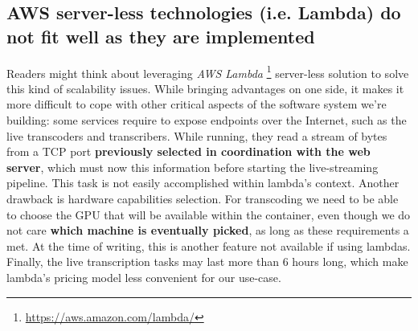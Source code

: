 \documentclass{article}
\begin{document}
\subsection{AWS server-less technologies (i.e. Lambda) do not fit well as they are implemented}
Readers might think about leveraging \textit{AWS Lambda} \footnote{\url{https://aws.amazon.com/lambda/}} server-less solution to solve this kind of scalability issues. While bringing advantages on one side, it makes it more difficult to cope with other critical aspects of the software system we're building: some services require to expose endpoints over the Internet, such as the live transcoders and transcribers. While running, they read a stream of bytes from a TCP port \textbf{previously selected in coordination with the web server}, which must now this information before starting the live-streaming pipeline. This task is not easily accomplished within lambda's context. Another drawback is hardware capabilities selection. For transcoding we need to be able to choose the GPU that will be available within the container, even though we do not care \textbf{which machine is eventually picked}, as long as these requirements a met. At the time of writing, this is another feature not available if using lambdas. Finally, the live transcription tasks may last more than 6 hours long, which make lambda's pricing model less convenient for our use-case.
\end{document}
